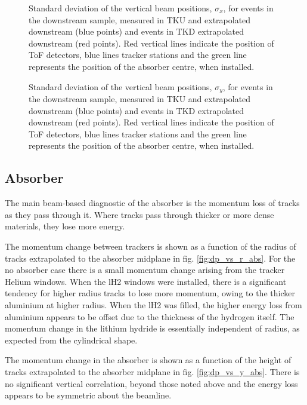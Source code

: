 \begin{figure}[!tbh]
    \centering
   {Standard deviation of the vertical beam positions, $\sigma_{x}$, for events 
    in the downstream sample, measured in TKU and extrapolated downstream 
    (blue points) and events in TKD extrapolated downstream (red points). Red 
    vertical lines indicate the position of ToF detectors, blue lines tracker 
    stations and the green line represents the position of the absorber centre, 
    when installed. 
    \label{fig:sigma_x}}
\end{figure}

\begin{figure}[!tbh]
    \centering
   {Standard deviation of the vertical beam positions, $\sigma_{y}$, for events 
    in the downstream sample, measured in TKU and extrapolated downstream (blue 
    points) and events in TKD extrapolated downstream (red points). Red 
    vertical lines indicate the position of ToF detectors, blue lines tracker 
    stations and the green line represents the position of the absorber centre, 
    when installed. 
    \label{fig:sigma_y}}
\end{figure}

\clearpage

\subsection{Absorber}

The main beam-based diagnostic of the absorber is the momentum loss of tracks
as they pass through it. Where tracks pass through thicker or more dense 
materials, they lose more energy.

The momentum change between trackers is shown as a function of the radius of
tracks extrapolated to the absorber midplane in fig. \ref{fig:dp_vs_r_abs}. For
the no absorber case there is a small momentum change arising
from the tracker Helium windows. When the lH2 windows were installed, there is
a significant tendency for higher radius tracks to lose more momentum, owing to
the thicker aluminium at higher radius. When the lH2 was filled, the higher
energy loss from aluminium appears to be offset due to the thickness of the
hydrogen itself. The momentum change in the lithium hydride is essentially
independent of radius, as expected from the cylindrical shape.

The momentum change in the absorber is shown as a function of the height of
tracks extrapolated to the absorber midplane in fig.  \ref{fig:dp_vs_y_abs}. 
There is no significant vertical correlation, beyond those noted above and the 
energy loss appears to be symmetric about the beamline.

